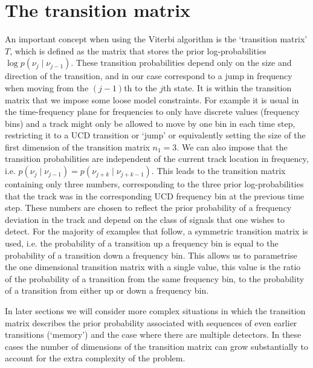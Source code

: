 \section{\label{soap:viterbi:transition}The transition matrix}
%
%
An important concept when using the Viterbi algorithm is the `transition matrix' $T$, which is defined as the matrix that stores the prior log-probabilities $\log p(\nu_j \mid \nu_{j-1})$. These transition probabilities depend only on the size and direction of the transition, and in our case correspond to a jump in frequency when moving from the $(j-1)$th to the $j$th state. It is within the transition matrix that we impose some loose model constraints. For example it is usual in the time-frequency plane for frequencies to only have discrete values (frequency bins) and a track might only be allowed to move by one bin in each time step, restricting it to a \gls{UCD} transition or `jump' or equivalently setting the size of the first dimension of the transition matrix $n_1 = 3$. We can also impose that the transition probabilities are independent of the current track location in frequency, i.e. $p(\nu_j \mid \nu_{j-1})=p(\nu_{j+k} \mid \nu_{j+k-1})$. This leads to the transition matrix containing only three numbers, corresponding to the three prior log-probabilities that the track was in the corresponding \gls{UCD} frequency bin at the previous time step. These numbers are chosen to reflect the prior probability of a frequency deviation in the track and depend on the class of signals that one wishes to detect.
For the majority of examples that follow, a symmetric transition matrix is used, i.e. the probability of a transition up a frequency bin is equal to the probability of a transition down a frequency bin. This allows us to parametrise the one dimensional transition matrix with a single value, this value is the ratio of the probability of a transition from the same frequency bin, to the probability of a transition from either up or down a frequency bin. 

In later sections we will consider more complex situations in which the transition matrix describes the prior probability associated with sequences of even earlier transitions (`memory') and the case where there are multiple detectors. In these cases the number of dimensions of the transition matrix can grow substantially to account for the extra complexity of the problem.

